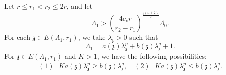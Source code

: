 \documentclass[11pt,oneside, english,reqno,twoside a4paper]{amsart}
\theoremstyle{definition}
\numberwithin{theorem}{section}
\numberwithin{equation}{section}
\newcommand{\mfz}{\mathfrak{z}}
\begin{document}
Let $r\leq r_1< r_2\leq 2r$, and let
\begin{equation}    \label{eq: definition of Lambda}
    \Lambda_1 > \left(\frac{4c_v r}{r_2-r_1}\right)^\frac{q(n+2)}{2}\Lambda_0.
\end{equation}
For each $\mathfrak{z} \in E(\Lambda_1,r_1)$, we take $\lambda_\mathfrak{z}>0$ such that 
\begin{equation}    \label{eq: definition of lambda z}
\Lambda_1=a(\mathfrak{z})\lambda_\mathfrak{z}^p+b(\mathfrak{z})\lambda_\mathfrak{z}^q+1.
\end{equation}
For $\mathfrak{z} \in E(\Lambda_1,r_1)$ and $K>1$, we have the following possibilities:
\begin{align}\label{possibilities depending on lambda zeta}
    (1)\,\,\,\, Ka(\mathfrak z)\lambda^p_{\mfz}\geq b(\mfz)\lambda^q_{\mfz}, \quad (2)\,\,\,\,Ka(\mathfrak z)\lambda^p_{\mfz}\leq b(\mfz)\lambda^q_{\mfz}.
\end{align}
\end{document}
